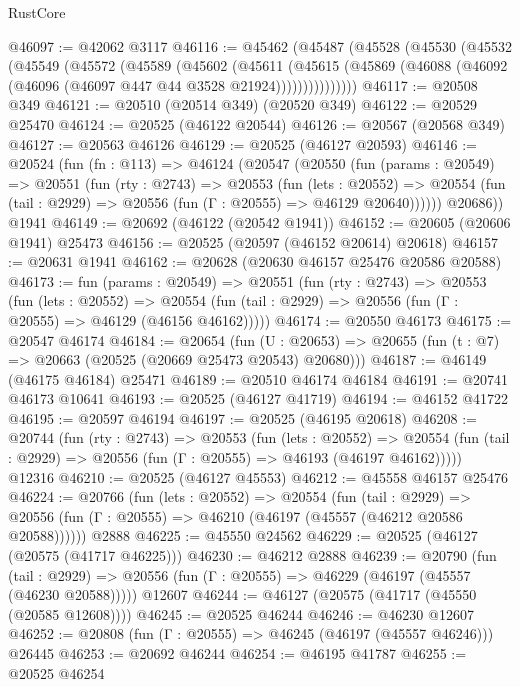 \begin{lexlean}{RustCore}
\begin{coremodule}
@46097 := @42062 @3117
@46116 := @45462
    (@45487
      (@45528
        (@45530
          (@45532
            (@45549
              (@45572
                (@45589
                  (@45602
                    (@45611
                      (@45615
                        (@45869 (@46088 (@46092 (@46096 (@46097 @447 @44 @3528 @21924)))))))))))))))
@46117 := @20508 @349
@46121 := @20510 (@20514 @349) (@20520 @349)
@46122 := @20529 @25470
@46124 := @20525 (@46122 @20544)
@46126 := @20567 (@20568 @349)
@46127 := @20563 @46126
@46129 := @20525 (@46127 @20593)
@46146 := @20524
    (fun (fn : @113) =>
    @46124
      (@20547
        (@20550
          (fun (params : @20549) =>
          @20551
            (fun (rty : @2743) =>
            @20553
              (fun (lets : @20552) =>
              @20554 (fun (tail : @2929) => @20556 (fun (Γ : @20555) => @46129 @20640))))))
        @20686))
    @1941
@46149 := @20692 (@46122 (@20542 @1941))
@46152 := @20605 (@20606 @1941) @25473
@46156 := @20525 (@20597 (@46152 @20614) @20618)
@46157 := @20631 @1941
@46162 := @20628 (@20630 @46157 @25476 @20586 @20588)
@46173 := fun (params : @20549) =>
  @20551
    (fun (rty : @2743) =>
    @20553
      (fun (lets : @20552) =>
      @20554 (fun (tail : @2929) => @20556 (fun (Γ : @20555) => @46129 (@46156 @46162)))))
@46174 := @20550 @46173
@46175 := @20547 @46174
@46184 := @20654
    (fun (U : @20653) => @20655 (fun (t : @7) => @20663 (@20525 (@20669 @25473 @20543) @20680)))
@46187 := @46149 (@46175 @46184) @25471
@46189 := @20510 @46174 @46184
@46191 := @20741 @46173 @10641
@46193 := @20525 (@46127 @41719)
@46194 := @46152 @41722
@46195 := @20597 @46194
@46197 := @20525 (@46195 @20618)
@46208 := @20744
    (fun (rty : @2743) =>
    @20553
      (fun (lets : @20552) =>
      @20554 (fun (tail : @2929) => @20556 (fun (Γ : @20555) => @46193 (@46197 @46162)))))
    @12316
@46210 := @20525 (@46127 @45553)
@46212 := @45558 @46157 @25476
@46224 := @20766
    (fun (lets : @20552) =>
    @20554
      (fun (tail : @2929) =>
      @20556 (fun (Γ : @20555) => @46210 (@46197 (@45557 (@46212 @20586 @20588))))))
    @2888
@46225 := @45550 @24562
@46229 := @20525 (@46127 (@20575 (@41717 @46225)))
@46230 := @46212 @2888
@46239 := @20790
    (fun (tail : @2929) => @20556 (fun (Γ : @20555) => @46229 (@46197 (@45557 (@46230 @20588)))))
    @12607
@46244 := @46127 (@20575 (@41717 (@45550 (@20585 @12608))))
@46245 := @20525 @46244
@46246 := @46230 @12607
@46252 := @20808 (fun (Γ : @20555) => @46245 (@46197 (@45557 @46246))) @26445
@46253 := @20692 @46244
@46254 := @46195 @41787
@46255 := @20525 @46254

\end{coremodule}
\end{lexlean}
